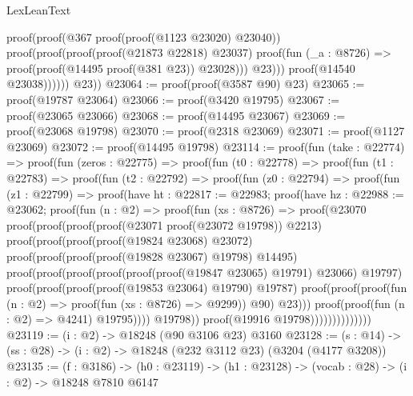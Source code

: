 \begin{lexlean}{LexLeanText}
\begin{coremodule}
                        proof(proof(@367 proof(proof(@1123 @23020) @23040))
                            proof(proof(proof(proof(@21873 @22818) @23037)
                                  proof(fun (_a : @8726) =>
                                    proof(proof(@14495 proof(@381 @23)) @23028)))
                                @23)))
                      proof(@14540 @23038))))))
        @23))
@23064 := proof(proof(@3587 @90) @23)
@23065 := proof(@19787 @23064)
@23066 := proof(@3420 @19795)
@23067 := proof(@23065 @23066)
@23068 := proof(@14495 @23067)
@23069 := proof(@23068 @19798)
@23070 := proof(@2318 @23069)
@23071 := proof(@1127 @23069)
@23072 := proof(@14495 @19798)
@23114 := proof(fun (take : @22774) =>
    proof(fun (zeros : @22775) =>
      proof(fun (t0 : @22778) =>
        proof(fun (t1 : @22783) =>
          proof(fun (t2 : @22792) =>
            proof(fun (z0 : @22794) =>
              proof(fun (z1 : @22799) =>
                proof(have ht : @22817 := @22983;
                  proof(have hz : @22988 := @23062;
                    proof(fun (n : @2) =>
                      proof(fun (xs : @8726) =>
                        proof(@23070
                            proof(proof(proof(proof(@23071 proof(@23072 @19798)) @2213)
                                  proof(proof(proof(proof(@19824 @23068) @23072)
                                        proof(proof(proof(proof(@19828 @23067) @19798) @14495)
                                            proof(proof(proof(proof(proof(proof(@19847 @23065)
                                                        @19791)
                                                      @23066)
                                                    @19797)
                                                  proof(proof(proof(proof(@19853 @23064) @19790)
                                                        @19787)
                                                      proof(proof(proof(fun (n : @2) =>
                                                            proof(fun (xs : @8726) => @9299))
                                                            @90)
                                                          @23)))
                                                proof(proof(fun (n : @2) => @4241) @19795))))
                                      @19798))
                                proof(@19916 @19798))))))))))))))
@23119 := (i : @2) -> @18248 (@90 @3106 @23) @3160
@23128 := (s : @14) -> (ss : @28) -> (i : @2) -> @18248 (@232 @3112 @23) (@3204 (@4177 @3208))
@23135 := (f : @3186) ->
  (h0 : @23119) -> (h1 : @23128) -> (vocab : @28) -> (i : @2) -> @18248 @7810 @6147

\end{coremodule}
\end{lexlean}
